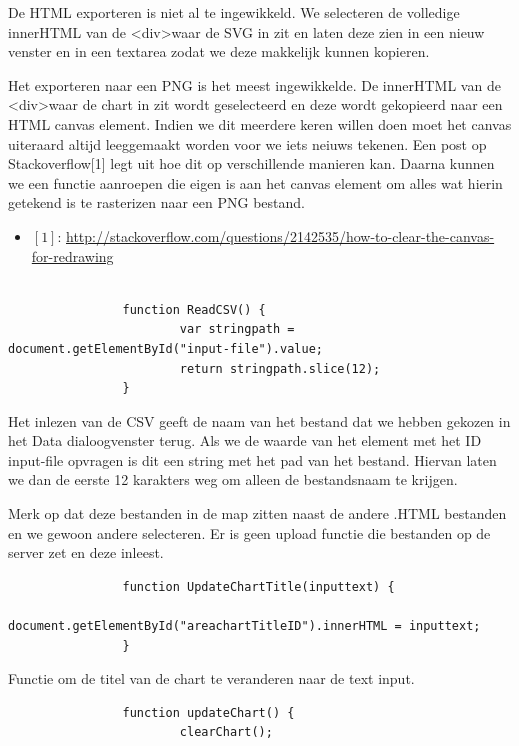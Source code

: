 De HTML exporteren is niet al te ingewikkeld. We selecteren de volledige innerHTML van de \textless div\textgreater waar de SVG in zit en laten deze zien in een nieuw venster en in een textarea zodat we deze makkelijk kunnen kopieren.  

Het exporteren naar een PNG is het meest ingewikkelde. De innerHTML van de \textless div\textgreater waar de chart in zit wordt geselecteerd en deze wordt gekopieerd naar een HTML canvas element. Indien we dit meerdere keren willen doen moet het canvas uiteraard altijd leeggemaakt worden voor we iets neiuws tekenen. Een post op Stackoverflow[1] legt uit hoe dit op verschillende manieren kan. Daarna kunnen we een functie aanroepen die eigen is aan het canvas element om alles wat hierin getekend is te rasterizen naar een PNG bestand.

\begin{itemize}
 \item $[1]$: \url{http://stackoverflow.com/questions/2142535/how-to-clear-the-canvas-for-redrawing}
\end{itemize}
\begin{lstlisting}

                function ReadCSV() {
                        var stringpath = document.getElementById("input-file").value;
                        return stringpath.slice(12);
                }
\end{lstlisting}

Het inlezen van de CSV geeft de naam van het bestand dat we hebben gekozen in het Data dialoogvenster terug. Als we de waarde van het element met het ID input-file opvragen is dit een string met het pad van het bestand. Hiervan laten we dan de eerste 12 karakters weg om alleen de bestandsnaam te krijgen.

Merk op dat deze bestanden in de map zitten naast de andere .HTML bestanden en we gewoon andere selecteren. Er is geen upload functie die bestanden op de server zet en deze inleest.

\begin{lstlisting}
                function UpdateChartTitle(inputtext) {
                        document.getElementById("areachartTitleID").innerHTML = inputtext;
                }
\end{lstlisting}

Functie om de titel van de chart te veranderen naar de text input.

\begin{lstlisting}
                function updateChart() {
                        clearChart();
\end{lstlisting}

